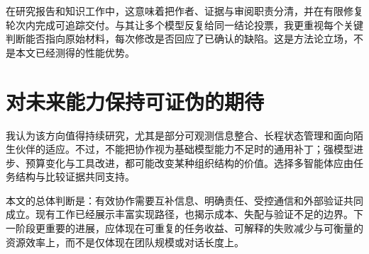 \documentclass[UTF8,a4paper,fontset=fandol,zihao=5,openany]{ctexrep}
\begin{document}
在研究报告和知识工作中，这意味着把作者、证据与审阅职责分清，并在有限修复轮次内完成可追踪交付。与其让多个模型反复给同一结论投票，我更重视每个关键判断能否指向原始材料，每次修改是否回应了已确认的缺陷。这是方法论立场，不是本文已经测得的性能优势。


\section{对未来能力保持可证伪的期待}
我认为该方向值得持续研究，尤其是部分可观测信息整合、长程状态管理和面向陌生伙伴的适应。不过，不能把协作视为基础模型能力不足时的通用补丁；强模型进步、预算变化与工具改进，都可能改变某种组织结构的价值。选择多智能体应由任务结构与比较证据共同支持。

本文的总体判断是：有效协作需要互补信息、明确责任、受控通信和外部验证共同成立。现有工作已经展示丰富实现路径，也揭示成本、失配与验证不足的边界。下一阶段更重要的进展，应体现在可重复的任务收益、可解释的失败减少与可衡量的资源效率上，而不是仅体现在团队规模或对话长度上。


\clearpage
{}
{}


\end{document}
